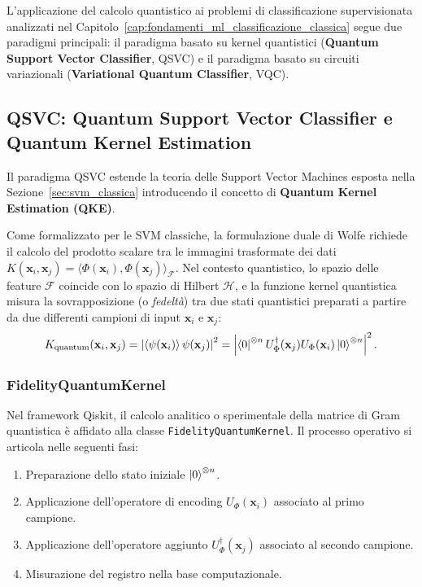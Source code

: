 L'applicazione del calcolo quantistico ai problemi di classificazione supervisionata analizzati nel Capitolo~\ref{cap:fondamenti_ml_classificazione_classica} segue due paradigmi principali: il paradigma basato su kernel quantistici (\textbf{Quantum Support Vector Classifier}, QSVC) e il paradigma basato su circuiti variazionali (\textbf{Variational Quantum Classifier}, VQC).

\subsection{QSVC: Quantum Support Vector Classifier e Quantum Kernel Estimation}
Il paradigma QSVC estende la teoria delle Support Vector Machines esposta nella Sezione~\ref{sec:svm_classica} introducendo il concetto di \textbf{Quantum Kernel Estimation (QKE)}.

Come formalizzato per le SVM classiche, la formulazione duale di Wolfe richiede il calcolo del prodotto scalare tra le immagini trasformate dei dati $K(\mathbf{x}_i, \mathbf{x}_j) = \langle \Phi(\mathbf{x}_i), \Phi(\mathbf{x}_j) \rangle_{\mathcal{F}}$. Nel contesto quantistico, lo spazio delle feature $\mathcal{F}$ coincide con lo spazio di Hilbert $\mathcal{H}$, e la funzione kernel quantistica misura la sovrapposizione (o \textit{fedeltà}) tra due stati quantistici preparati a partire da due differenti campioni di input $\mathbf{x}_i$ e $\mathbf{x}_j$:
\begin{equation}
K_{\text{quantum}}(\mathbf{x}_i, \mathbf{x}_j) = \left| \braket{\psi(\mathbf{x}_i)}{\psi(\mathbf{x}_j)} \right|^2 = \left| \bra{0}^{\otimes n} U_{\Phi}^\dagger(\mathbf{x}_j) U_{\Phi}(\mathbf{x}_i) \ket{0}^{\otimes n} \right|^2.
\end{equation}

\subsubsection{FidelityQuantumKernel}
Nel framework Qiskit, il calcolo analitico o sperimentale della matrice di Gram quantistica è affidato alla classe \texttt{FidelityQuantumKernel}. Il processo operativo si articola nelle seguenti fasi:
\begin{enumerate}
    \item Preparazione dello stato iniziale $\ket{0}^{\otimes n}$.
    \item Applicazione dell'operatore di encoding $U_{\Phi}(\mathbf{x}_i)$ associato al primo campione.
    \item Applicazione dell'operatore aggiunto $U_{\Phi}^\dagger(\mathbf{x}_j)$ associato al secondo campione.
    \item Misurazione del registro nella base computazionale.
\end{enumerate}

